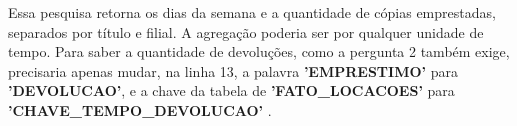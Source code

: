 Essa pesquisa retorna os dias da semana e a quantidade 
de cópias emprestadas, separados por título  e filial. 
A agregação poderia ser por qualquer unidade de tempo. 
Para saber a quantidade de devoluções, como a pergunta 2 
também exige, precisaria apenas mudar, na linha 13, a palavra 
\textbf{'EMPRESTIMO'} para \textbf{'DEVOLUCAO'}, e a chave da tabela 
de \textbf{'FATO\_LOCACOES'} para 
\textbf{'CHAVE\_TEMPO\_DEVOLUCAO'} .

